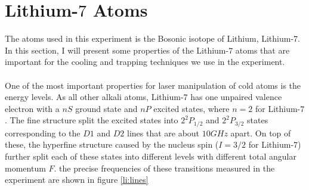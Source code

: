 \section{Lithium-$7$ Atoms}

The atoms used in this experiment is the Bosonic isotope of Lithium, Lithium-$7$. In this section, I will present some properties of the Lithium-$7$ atoms that are important for the cooling and trapping techniques we use in the experiment.\\
\\
One of the most important properties for laser manipulation of cold atoms is the energy levels. As all other alkali atoms, Lithium-$7$ has one unpaired valence electron with a $nS$ ground state and $nP$ excited states, where $n=2$ for Lithium-$7$. The fine structure split the excited states into $2^2P_{1/2}$ and $2^2P_{3/2}$ states corresponding to the $D1$ and $D2$ lines that are about $10GHz$ apart. On top of these, the hyperfine structure caused by the nucleus spin ($I=3/2$ for Lithium-$7$) further split each of these states into different levels with different total angular momentum $F$. the precise frequencies of these transitions measured in the experiment are shown in figure \ref{li:lines}\\
